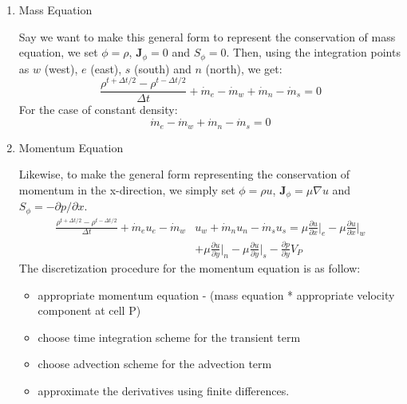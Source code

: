 \documentclass[11pt]{article}
\begin{document}
\begin{enumerate}
\item Mass Equation
\label{sec:org3cb0a58}

Say we want to make this general form to represent the conservation of mass equation, we set
\(\phi = \rho\), \(\textbf{J}_\phi = 0\) and \(S_\phi = 0\). Then, using the integration points as
\(w\) (west), \(e\) (east), \(s\) (south) and \(n\) (north), we get:
\begin{equation*}
\frac{\rho ^{t+\Delta t/2}-\rho^{t-\Delta t/2}}{\Delta t} + \dot{m}_e - \dot{m}_w
+ \dot{m}_n - \dot{m}_s = 0
\end{equation*}
For the case of constant density:
\begin{equation*}
\dot{m}_e - \dot{m}_w + \dot{m}_n - \dot{m}_s = 0
\end{equation*}

\item Momentum Equation
\label{sec:org7d33577}

Likewise, to make the general form representing the conservation of momentum in the x-direction,
we simply set \(\phi = \rho u\), \(\textbf{J}_\phi = \mu \nabla u\) and \(S_\phi = -\partial p/\partial x\). 
\begin{equation*}
\begin{aligned}
\frac{\rho ^{t+\Delta t/2}-\rho^{t-\Delta t/2}}{\Delta t} + \dot{m}_eu_e - \dot{m}_w&u_w
+ \dot{m}_nu_n - \dot{m}_su_s = \mu \frac{\partial u}{\partial x}\biggr\rvert_e
- \mu \frac{\partial u}{\partial x}\biggr\rvert_w \\
&+ \mu \frac{\partial u}{\partial y}\biggr\rvert_n - \mu \frac{\partial u}{\partial y}\biggr\rvert_s
- \frac{\partial p}{\partial y}V_P
\end{aligned}
\end{equation*}
The discretization procedure for the momentum equation is as follow:
\begin{itemize}
\item appropriate momentum equation - (mass equation * appropriate velocity component at cell P)
\item choose time integration scheme for the transient term
\item choose advection scheme for the advection term
\item approximate the derivatives using finite differences.
\end{itemize}


\end{enumerate}
\end{document}
